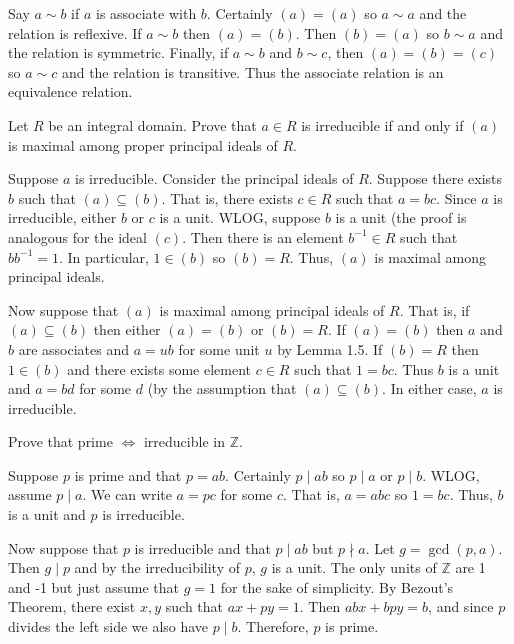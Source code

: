 \documentclass[../../master.tex]{subfiles}
\begin{document}
    \begin{solution}
        Say $a \sim b$ if $a$ is associate with $b$. Certainly $(a) = (a)$ so $a
        \sim a$ and the relation is reflexive. If $a \sim b$ then $(a) = (b)$.
        Then $(b) = (a)$ so $b \sim a$ and the relation is symmetric. Finally,
        if $a \sim b$ and $b \sim c$, then $(a) = (b) = (c)$ so $a \sim c$ and
        the relation is transitive. Thus the associate relation is an
        equivalence relation.
    \end{solution}

    \begin{problem}
        Let $R$ be an integral domain. Prove that $a \in R$ is irreducible if
        and only if $(a)$ is maximal among proper principal ideals of $R$.
    \end{problem}

    \begin{solution}
        Suppose $a$ is irreducible. Consider the principal ideals of $R$.
        Suppose there exists $b$ such that $(a) \subseteq (b)$. That is, there
        exists $c \in R$ such that $a = bc$. Since $a$ is irreducible, either
        $b$ or $c$ is a unit. WLOG, suppose $b$ is a unit (the proof is
        analogous for the ideal $(c)$. Then there is an element $b^{-1} \in R$ such
        that $b b^{-1} = 1$. In particular, $1 \in (b)$ so $(b) = R$. Thus,
        $(a)$ is maximal among principal ideals.

        Now suppose that $(a)$ is maximal among principal ideals of $R$. That
        is, if $(a) \subseteq (b)$ then either $(a) = (b)$ or $(b) = R$. If $(a)
        = (b)$ then $a$ and $b$ are associates and $a = ub$ for some unit $u$ by
        Lemma 1.5. If $(b) = R$ then $1 \in (b)$ and there exists some element
        $c \in R$ such that $1 = bc$. Thus $b$ is a unit and $a = bd$ for some
        $d$ (by the assumption that $(a) \subseteq (b)$. In either case, $a$ is
        irreducible.
    \end{solution}

    \begin{problem}
        Prove that prime $\Longleftrightarrow$ irreducible in $\mathbb{Z}$.
    \end{problem}

    \begin{solution}
        Suppose $p$ is prime and that $p = ab$. Certainly $p \mid ab$ so $p \mid
        a$ or $p \mid b$. WLOG, assume $p \mid a$. We can write $a = pc$ for some
        $c$. That is, $a = abc$ so $1 = bc$. Thus, $b$ is a unit and $p$ is
        irreducible.

        Now suppose that $p$ is irreducible and that $p \mid ab$ but $p \nmid a$.
        Let $g = \gcd(p, a)$. Then $g \mid p$ and by the irreducibility of $p$,
        $g$ is a unit. The only units of $\mathbb{Z}$ are 1 and -1 but just assume
        that $g = 1$ for the sake of simplicity. By Bezout's Theorem, there
        exist $x, y$ such that $ax + py = 1$. Then $abx + bpy = b$, and since
        $p$ divides the left side we also have $p \mid b$. Therefore, $p$ is
        prime.
    \end{solution}
\end{document}
